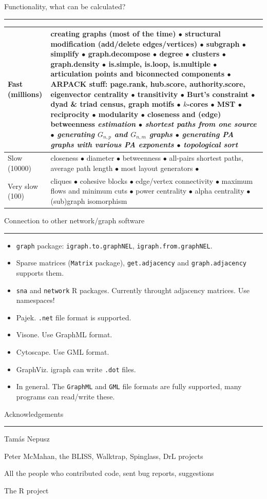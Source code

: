 \documentclass[landscape]{foils}
\newcommand{\stitle}[1]{{\centering\color{blue}\Large #1\par\vspace*{10pt}\hrule}}
\newcommand{\bull}{$\bullet$\xspace}
\begin{document}
\newpage
\stitle{Functionality, what can be calculated?}
\renewcommand{\arraystretch}{1.7}
\begin{tabularx}{\textwidth}{l|X}
Fast (millions) & creating graphs (most of the time) \bull
       structural modification (add/delete edges/vertices) \bull 
       subgraph \bull simplify \bull graph.decompose \bull 
       degree \bull clusters \bull graph.density \bull is.simple,
       is.loop, is.multiple \bull articulation points and biconnected
       components \bull ARPACK stuff: page.rank, hub.score,
       authority.score, eigenvector centrality \bull transitivity \bull Burt's
       constraint \bull dyad \& triad census, graph motifs \bull
       $k$-cores \bull MST \bull reciprocity \bull modularity \bull
       closeness and (edge) betweenness \it{estimation} \bull shortest
       paths from one source \bull generating $G_{n,p}$ and $G_{n,m}$
       graphs \bull generating PA graphs with various PA exponents
       \bull topological sort \\
\hline
Slow (10000) & closeness \bull diameter \bull betweenness \bull all-pairs
       shortest paths, average path length \bull most layout
       generators \bull \\
\hline
Very slow (100) & cliques \bull cohesive blocks \bull edge/vertex
            connectivity \bull maximum flows and minimum cuts \bull 
            power centrality \bull alpha centrality \bull (sub)graph isomorphism\\
\end{tabularx}

\newpage
\stitle{Connection to other network/graph software}
\begin{itemize}
\item \texttt{graph} package: \texttt{igraph.to.graphNEL},
  \texttt{igraph.from.graphNEL}. \pause
\item Sparse matrices (\texttt{Matrix} package),
  \texttt{get.adjacency} and \texttt{graph.adjacency} supports them. \pause
\item \texttt{sna} and \texttt{network} R packages. Currently throught
  adjacency matrices. Use namespaces! \pause
\item Pajek. \texttt{.net} file format is supported. \pause
\item Visone. Use GraphML format. \pause
\item Cytoscape. Use GML format. \pause
\item GraphViz. igraph can write \texttt{.dot} files. \pause
\item In general. The \texttt{GraphML} and \texttt{GML} file formats 
  are fully supported, many programs can read/write these.
\end{itemize}

\newpage
\stitle{Acknowledgements}
\begin{center}
\setlength{\parskip}{30pt}
\vfill
Tam\'as Nepusz\par\vfil
Peter McMahan, the BLISS, Walktrap, Spinglass, DrL projects\par\vfil
All the people who contributed code, sent bug reports, suggestions\par\vfil
The R project\par\vfil
\end{center}
\vfill\mbox{}\vfill
\end{document}

